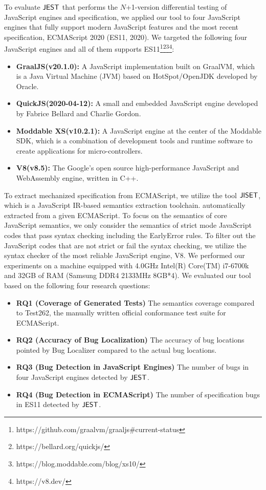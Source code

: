 To evaluate $\text{\sf JEST}$ that performs the $N$+1-version differential testing of JavaScript
engines and specification, we applied our tool to four JavaScript engines that
fully support modern JavaScript features and the most recent specification,
ECMAScript 2020 (ES11, 2020).  We targeted the following four JavaScript
engines and all of them supports
ES11\footnote{https://github.com/graalvm/graaljs\#current-status}\footnote{https://bellard.org/quickjs/}\footnote{https://blog.moddable.com/blog/xs10/}\footnote{https://v8.dev/}:
\begin{itemize}
  \item \textbf{GraalJS(v20.1.0):} A JavaScript implementation built on
    GraalVM\cite{graaljs}, which is a Java Virtual Machine (JVM) based on
    HotSpot/OpenJDK developed by Oracle.
  \item \textbf{QuickJS(2020-04-12):} A small and embedded JavaScript engine developed by
    Fabrice Bellard and Charlie Gordon\cite{qjs}.
  \item \textbf{Moddable XS(v10.2.1):} A JavaScript engine at the center of the Moddable
    SDK\cite{xs}, which is a combination of development tools and runtime
    software to create applications for micro-controllers.
  \item \textbf{V8(v8.5):} The Google's open source high-performance JavaScript and
    WebAssembly engine\cite{v8}, written in C++.
\end{itemize}
To extract mechanized specification from ECMAScript, we utilize the tool
$\text{\sf JISET}$, which is a JavaScript IR-based semantics extraction toolchain.
automatically extracted from a given ECMAScript.  To focus on the semantics of
core JavaScript semantics, we only consider the semantics of strict mode
JavaScript codes that pass syntax checking including the EarlyError rules.  To
filter out the JavaScript codes that are not strict or fail the syntax checking,
we utilize the syntax checker of the most reliable JavaScript engine, V8.
We performed our experiments on a machine equipped with 4.0GHz Intel(R) Core(TM)
i7-6700k and 32GB of RAM (Samsung DDR4 2133MHz 8GB*4).  We evaluated our tool
based on the following four research questions:
\begin{itemize}
  \item {\bf RQ1 (Coverage of Generated Tests)} The semantics coverage compared
    to Test262, the manually written official conformance test suite for
    ECMAScript.
  \item {\bf RQ2 (Accuracy of Bug Localization)} The accuracy of bug locations
    pointed by \textsf{Bug Localizer} compared to the actual bug locations.
  \item {\bf RQ3 (Bug Detection in JavaScript Engines)} The number of bugs in
    four JavaScript engines detected by $\text{\sf JEST}$.
  \item {\bf RQ4 (Bug Detection in ECMAScript)} The number of specification bugs
    in ES11 detected by $\text{\sf JEST}$.
\end{itemize}


